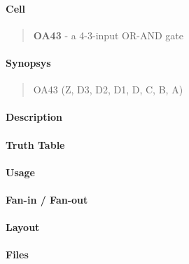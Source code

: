 \label{OA43}
\paragraph{Cell}
\begin{quote}
    \textbf{OA43} - a 4-3-input OR-AND gate
\end{quote}

\paragraph{Synopsys}
\begin{quote}
    OA43 (Z, D3, D2, D1, D, C, B, A)
\end{quote}

\paragraph{Description}

%

\paragraph{Truth Table}
%

\paragraph{Usage}

\paragraph{Fan-in / Fan-out}

\paragraph{Layout}

\paragraph{Files}
